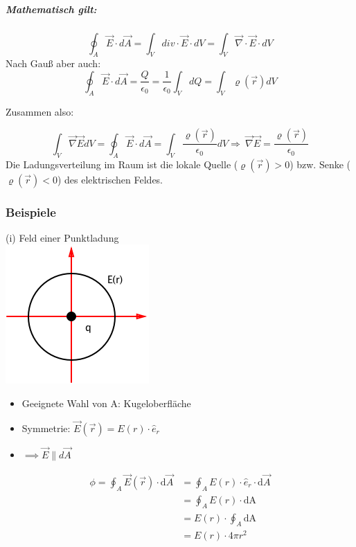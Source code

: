 \documentclass[11pt]{article}
\begin{document}
\subparagraph{Mathematisch gilt:}

$$\oint_{A}\vec{E}\cdot d\vec{A}=\int_{V} div\cdot \vec{E}\cdot dV=\int_{V}\vec{\nabla}\cdot\vec{E}\cdot dV$$
Nach Gau\ss{} aber auch:
$$\oint_{A}\vec{E}\cdot d\vec{A}=\frac{Q}{\epsilon_0}=\frac{1}{\epsilon_0}\int_VdQ=\int_V\varrho(\vec r)dV$$

Zusammen also:

$$\int_{V}\vec{\nabla}\vec{E}dV=\oint_{A}\vec{E}\cdot d\vec{A}=\int_{V}\frac{\varrho(\vec{r})}{\epsilon_0}dV
\Rightarrow\boxed{\ \vec{\nabla}\vec{E}=\frac{\varrho(\vec{r})}{\epsilon_0}}$$
Die Ladungsverteilung im Raum ist die lokale Quelle ($\varrho(\vec{r})>0$) bzw. Senke ($\varrho(\vec{r})<0$) des elektrischen Feldes.

\subsubsection{Beispiele}

(i) Feld einer Punktladung\\

\includegraphics{skizzen/14/14_6B2}\\

\begin{itemize}
	\item Geeignete Wahl von A: Kugeloberfläche
	\item Symmetrie: $\vec{E}(\vec{r})=E(r)\cdot\hat e_r$
	\item $\implies \vec{E}\parallel d\vec{A}$
\end{itemize}

\begin{align*}
	\phi=\oint_{A}\vec{E}(\vec{r})\cdot\mathrm{d}\vec{A} & = \oint_{A}E(r)\cdot\hat{e}_r\cdot\mathrm{d}\vec{A}\\
	&=\oint_{A}E(r)\cdot\mathrm{dA}\\
	&= E(r)\cdot\oint_{A}\mathrm{dA}\\
	&= E(r)\cdot4\pi r^2
\end{align*}
\end{document}
